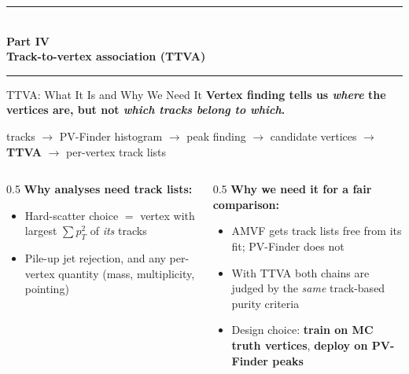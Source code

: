 \documentclass[xcolor=table,aspectratio=169]{beamer}
\newcommand{\partdivider}[2]{%
    \begin{frame}[plain]
        \centering
        \vfill
        {\color{pennred}\rule{0.4\linewidth}{1.2pt}}\\[0.6em]
        {\Large\textbf{Part #1}}\\[0.4em]
        {\LARGE\textbf{\textcolor{pennred}{#2}}}\\[0.6em]
        {\color{pennred}\rule{0.4\linewidth}{1.2pt}}
        \vfill
    \end{frame}%
}
\begin{document}

\partdivider{IV}{Track-to-vertex association (TTVA)}

\begin{frame}{TTVA: What It Is and Why We Need It}
    \textbf{Vertex finding tells us \emph{where} the vertices are, but not \emph{which tracks belong to which}.}
    \vspace{0.5em}
    \begin{center}
        tracks \(\to\) PV-Finder histogram \(\to\) peak finding \(\to\) candidate vertices
        \(\to\) \textcolor{pennred}{\textbf{TTVA}} \(\to\) per-vertex track lists
    \end{center}
    \vspace{0.5em}
    \begin{columns}[t]
        \begin{column}{0.5\linewidth}
            \textbf{Why analyses need track lists:}
            \begin{itemize}
                \setlength\itemsep{0.35em}
                \item Hard-scatter choice $=$ vertex with largest $\sum p_T^2$ of \emph{its} tracks
                \item Pile-up jet rejection, and any per-vertex quantity (mass, multiplicity, pointing)
            \end{itemize}
        \end{column}
        \begin{column}{0.5\linewidth}
            \textbf{Why we need it for a fair comparison:}
            \begin{itemize}
                \setlength\itemsep{0.35em}
                \item AMVF gets track lists free from its fit; PV-Finder does not
                \item With TTVA both chains are judged by the \emph{same} track-based purity criteria
                \item Design choice: \textbf{train on MC truth vertices}, \textbf{deploy on PV-Finder peaks}
            \end{itemize}
        \end{column}
    \end{columns}
\end{frame}
\end{document}
